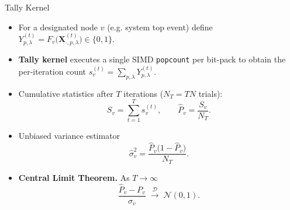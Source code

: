 \begin{frame}{Tally Kernel}
  \footnotesize
  \begin{itemize}
    \item For a designated node $v$ (e.g. system top event) define $Y_{p,\lambda}^{(t)} = F_v\bigl(\mathbf{X}_{\cdot,p,\lambda}^{(t)}\bigr)\in\{0,1\}$.
    \item \textbf{Tally kernel} executes a single SIMD \texttt{popcount} per bit-pack to obtain the per-iteration count
      $\displaystyle s_v^{(t)} = \sum_{p,\lambda} Y_{p,\lambda}^{(t)}$.
    \item Cumulative statistics after $T$ iterations ($N_T = T N$ trials):
      \[ S_v = \sum_{t=1}^{T} s_v^{(t)},\qquad \widehat P_v = \frac{S_v}{N_T}. \]
    \item Unbiased variance estimator
      \[ \widehat{\sigma}^2_v = \frac{\widehat P_v\bigl(1-\widehat P_v\bigr)}{N_T}. \]
    \item \textbf{Central Limit Theorem.}  As $T\to\infty$
      \[ \frac{\widehat P_v - P_v}{\widehat \sigma_v}\;\xrightarrow{\,\mathcal{D}\,}\;\mathcal N(0,1). \]
  \end{itemize}
\end{frame}

